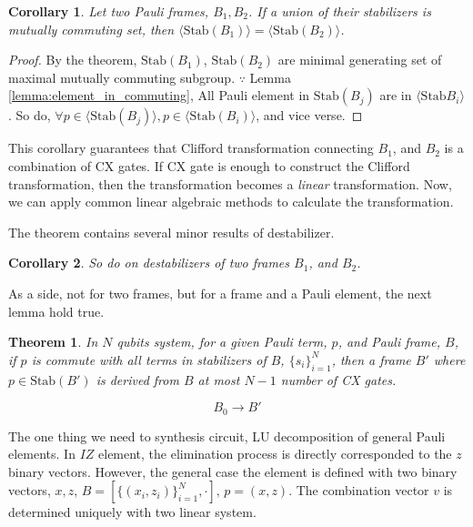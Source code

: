 \documentclass[a4paper,12pt]{article}
\newtheorem{theorem}{Theorem}
\newtheorem{corollary}{Corollary}
\begin{document}
\begin{corollary}
    Let two Pauli frames, $B_1, B_2$. 
    If a union of their stabilizers is mutually commuting set,
    then $\langle \mbox{Stab}(B_1) \rangle = \langle \mbox{Stab}(B_2) \rangle$.
\end{corollary}
\begin{proof}  
    By the theorem, $\mbox{Stab}(B_1)$, $\mbox{Stab}(B_2)$ are minimal generating set of maximal mutually commuting subgroup. 
    $\because$ Lemma \ref{lemma:element_in_commuting}, All Pauli element in $\mbox{Stab}(B_j)$ are in $\langle \mbox{Stab}{B_i} \rangle$.
So do, $\forall p \in \langle \mbox{Stab}(B_j)\rangle, p \in \langle \mbox{Stab}(B_i)\rangle$, and vice verse. 
\end{proof}

This corollary guarantees that Clifford transformation
connecting $B_1$, and $B_2$ is a combination of CX gates.
If CX gate is enough to construct the Clifford transformation,
then the transformation becomes a \textit{linear} transformation.
Now, we can apply common linear algebraic methods to calculate 
the transformation.

The theorem contains several minor results of destabilizer.

\begin{corollary}
    So do on destabilizers of two frames $B_1$, and $B_2$.
\end{corollary}

As a side, not for two frames, but for a frame and a Pauli element, the next lemma hold true.

\begin{theorem}
    In $N$ qubits system, for a given Pauli term, $p$, and Pauli frame, $B$,
    if $p$ is commute with all terms in stabilizers of $B$, $\{s_i\}_{i=1}^N$,
    then a frame $B'$ where $p \in \mbox{Stab}(B')$ is derived 
    from $B$ at most $N-1$ number of CX gates.
    
    \begin{equation}
        B_0 \rightarrow B'
    \end{equation}
\end{theorem}



The one thing we need to synthesis circuit, LU decomposition of 
general Pauli elements. In $IZ$ element, the elimination process is 
directly corresponded to the $z$ binary vectors.
However, the general case the element is defined with two binary vectors, $x, z$,
$B = [\{(x_i, z_i)\}_{i=1}^N, \cdot], \, p = (x, z)$.
The combination vector $v$ is determined uniquely with two linear system.
\end{document}

